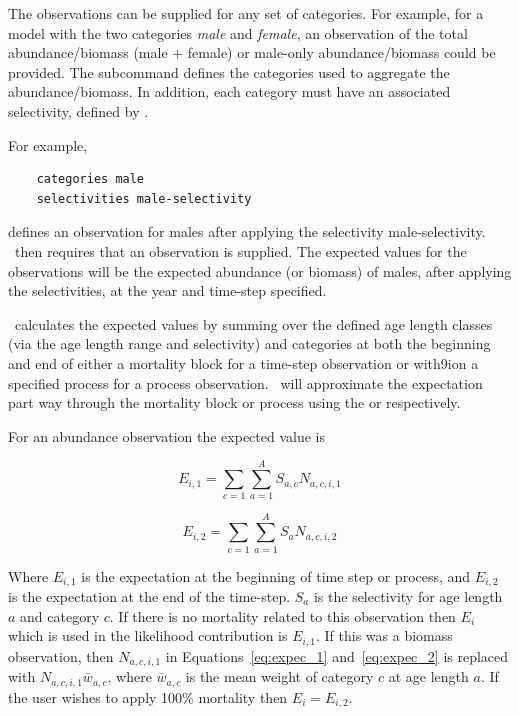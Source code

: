 The observations can be supplied for any set of categories. For example, for a model with the two categories \emph{male} and \emph{female}, an observation of the total abundance/biomass (male $+$ female) or male-only abundance/biomass could be provided. The subcommand  defines the categories used to aggregate the abundance/biomass. In addition, each category must have an associated selectivity, defined by .

For example,

{\small{\begin{verbatim}
	categories male
	selectivities male-selectivity
\end{verbatim}}}

defines an observation for males after applying the selectivity male-selectivity. \CNAME\ then requires that an observation is supplied. The expected values for the observations will be the expected abundance (or biomass) of males, after applying the selectivities, at the year and time-step specified.

\CNAME\ calculates the expected values by summing over the defined \ifAgeBased age \else length \fi classes (via the \ifAgeBased age \else length \fi range and selectivity) and categories at both the beginning and end of either a mortality block for a time-step observation or with9ion a specified process for a process observation. \CNAME\ will approximate the expectation part way through the mortality block or process using the  or  respectively. 

For an abundance observation the expected value is

\begin{equation}\label{eq:expec_1}
	E_{i,1} = \sum_{c=1}^{} \sum_{a=1}^{A} S_{a,c} N_{a,c,i,1}
\end{equation}

\begin{equation}\label{eq:expec_2}
	E_{i,2} = \sum_{c=1}^{} \sum_{a=1}^{A} S_a N_{a,c,i,2}
\end{equation}

Where $E_{i,1}$ is the expectation at the beginning of time step or process, and $E_{i,2}$ is the expectation at the end of the time-step. $S_a$ is the selectivity for \ifAgeBased age \else length \fi $a$ and category $c$. If there is no mortality related to this observation then $E_i$ which is used in the likelihood contribution is $E_{i,1}$. If this was a biomass observation, then $N_{a,c,i,1}$ in Equations~\eqref{eq:expec_1} and~\eqref{eq:expec_2} is replaced with $N_{a,c,i,1} \bar{w}_{a,c}$, where $\bar{w}_{a,c}$ is the mean weight of category $c$ at \ifAgeBased age \else length \fi $a$. If the user wishes to apply 100\% mortality then $E_i = E_{i,2}$.

